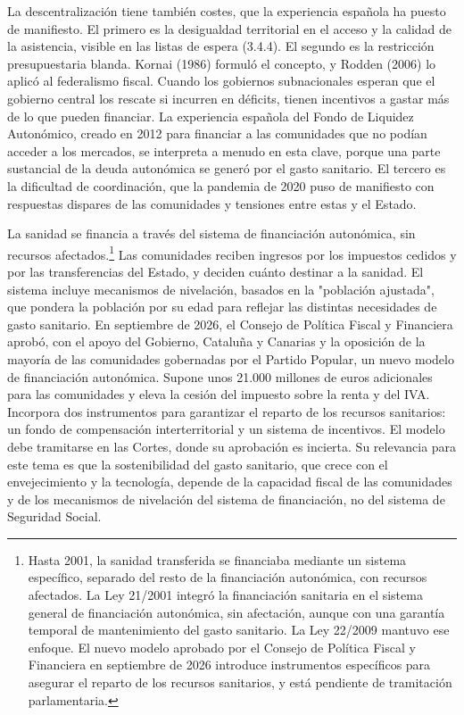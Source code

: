 \documentclass[10pt,a4paper]{article}
\begin{document}
La descentralización tiene también costes, que la experiencia española ha puesto de manifiesto. El primero es la desigualdad territorial en el acceso y la calidad de la asistencia, visible en las listas de espera (3.4.4). El segundo es la restricción presupuestaria blanda. Kornai (1986) formuló el concepto, y Rodden (2006) lo aplicó al federalismo fiscal. Cuando los gobiernos subnacionales esperan que el gobierno central los rescate si incurren en déficits, tienen incentivos a gastar más de lo que pueden financiar. La experiencia española del Fondo de Liquidez Autonómico, creado en 2012 para financiar a las comunidades que no podían acceder a los mercados, se interpreta a menudo en esta clave, porque una parte sustancial de la deuda autonómica se generó por el gasto sanitario. El tercero es la dificultad de coordinación, que la pandemia de 2020 puso de manifiesto con respuestas dispares de las comunidades y tensiones entre estas y el Estado.

La sanidad se financia a través del sistema de financiación autonómica, sin recursos afectados.\footnote{Hasta 2001, la sanidad transferida se financiaba mediante un sistema específico, separado del resto de la financiación autonómica, con recursos afectados. La Ley 21/2001 integró la financiación sanitaria en el sistema general de financiación autonómica, sin afectación, aunque con una garantía temporal de mantenimiento del gasto sanitario. La Ley 22/2009 mantuvo ese enfoque. El nuevo modelo aprobado por el Consejo de Política Fiscal y Financiera en septiembre de 2026 introduce instrumentos específicos para asegurar el reparto de los recursos sanitarios, y está pendiente de tramitación parlamentaria.
} Las comunidades reciben ingresos por los impuestos cedidos y por las transferencias del Estado, y deciden cuánto destinar a la sanidad. El sistema incluye mecanismos de nivelación, basados en la "población ajustada", que pondera la población por su edad para reflejar las distintas necesidades de gasto sanitario. En septiembre de 2026, el Consejo de Política Fiscal y Financiera aprobó, con el apoyo del Gobierno, Cataluña y Canarias y la oposición de la mayoría de las comunidades gobernadas por el Partido Popular, un nuevo modelo de financiación autonómica. Supone unos 21.000 millones de euros adicionales para las comunidades y eleva la cesión del impuesto sobre la renta y del IVA. Incorpora dos instrumentos para garantizar el reparto de los recursos sanitarios: un fondo de compensación interterritorial y un sistema de incentivos. El modelo debe tramitarse en las Cortes, donde su aprobación es incierta. Su relevancia para este tema es que la sostenibilidad del gasto sanitario, que crece con el envejecimiento y la tecnología, depende de la capacidad fiscal de las comunidades y de los mecanismos de nivelación del sistema de financiación, no del sistema de Seguridad Social.
\end{document}
